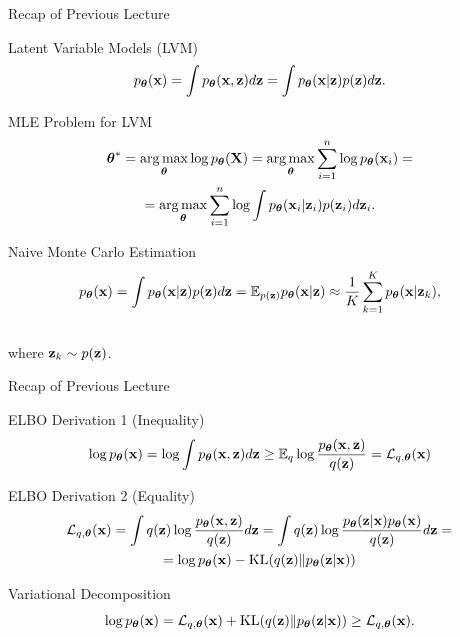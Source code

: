 \documentclass{beamer}
\begin{document}
\begin{frame}
	\titlepage
	\resetonslide
\end{frame}
\begin{frame}{Recap of Previous Lecture}
	\begin{block}{Latent Variable Models (LVM)}
		\vspace{-0.3cm}
		\[
			\pt(\bx) = \int \pt(\bx, \bz) d\bz = \int \pt(\bx | \bz) p(\bz) d\bz.
		\]
	\end{block}
	\begin{block}{MLE Problem for LVM}
		\vspace{-0.7cm}
		\begin{multline*}
			\btheta^* = \argmax_{\btheta} \log \pt(\bX) = \argmax_{\btheta} \sum_{i=1}^n \log \pt(\bx_i) = \\ = \argmax_{\btheta}  \sum_{i=1}^n \log \int \pt(\bx_i| \bz_i) p(\bz_i) d\bz_i.
		\end{multline*}
		\vspace{-0.7cm}
	\end{block}
	\begin{block}{Naive Monte Carlo Estimation}
		\vspace{-0.7cm}
		\[
			\pt(\bx) = \int \pt(\bx | \bz) p(\bz) d\bz = \bbE_{p(\bz)} \pt(\bx | \bz) \approx \frac{1}{K} \sum_{k=1}^{K} \pt(\bx | \bz_k),
		\]
		\vspace{-0.5cm} \\
		where $\bz_k \sim p(\bz)$. 
	\end{block}
\end{frame}
\begin{frame}{Recap of Previous Lecture}
	\begin{block}{ELBO Derivation 1 (Inequality)}
		\[
			\log \pt(\bx) = \log \int \pt(\bx, \bz) d\bz \geq \bbE_{q} \log \frac{\pt(\bx, \bz)}{q(\bz)} = \cL_{q, \btheta}(\bx)
		\]
		\vspace{-0.3cm}
	\end{block}
	\begin{block}{ELBO Derivation 2 (Equality)}
		\vspace{-0.3cm}
		\begin{multline*}
			\cL_{q, \btheta}(\bx) = \int q(\bz) \log \frac{\pt(\bx, \bz)}{q(\bz)}d\bz = 
			\int q(\bz) \log \frac{\pt(\bz|\bx)\pt(\bx)}{q(\bz)}d\bz = \\
			= \log \pt(\bx) - \KL(q(\bz) \| \pt(\bz|\bx))
		\end{multline*}
	\end{block}
	\vspace{-0.3cm}
	\begin{block}{Variational Decomposition}
		\[
		\log \pt(\bx) = \cL_{q, \btheta}(\bx) + \KL(q(\bz) \| \pt(\bz|\bx)) \geq \cL_{q, \btheta}(\bx).
		\]
	\end{block}
\end{frame}
\end{document}
